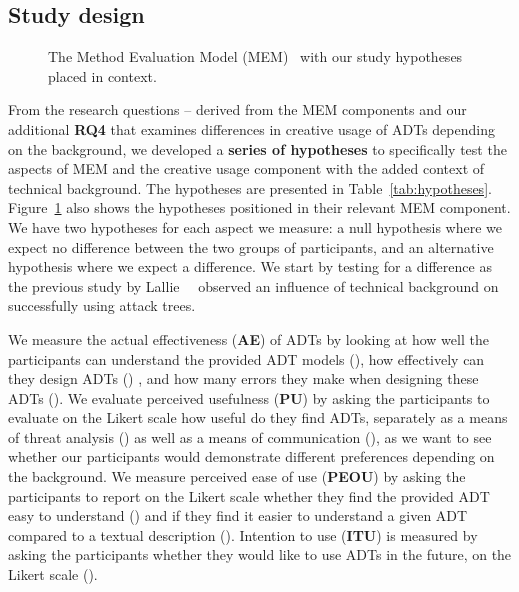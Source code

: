 \subsection{Study design}
\label{ssec:methodology-study-design}


\begin{figure}
\resizebox*{\columnwidth}{!}{}
\caption{The Method Evaluation Model (MEM)~\cite{moodyMethodEvaluationModel2003} with our study hypotheses placed in context.}
\label{fig:mem}
\end{figure}


From the research questions -- derived from the MEM components and our additional \textbf{RQ4} that examines differences in creative usage of ADTs depending on the background, we developed a \textbf{series of hypotheses} to specifically test the aspects of MEM and the creative usage component with the added context of technical background. The hypotheses are presented in Table~\ref{tab:hypotheses}. Figure~\ref{fig:mem} also shows the hypotheses positioned in their relevant MEM component. We have two hypotheses for each aspect we measure: a null hypothesis where we expect no difference between the two groups of participants, and an alternative hypothesis where we expect a difference. We start by testing for a difference as the previous study by Lallie~\etal~\cite{lallieEmpiricalEvaluationEffectiveness2017} observed an influence of technical background on successfully using attack trees.

We measure the actual effectiveness (\textbf{AE}) of ADTs by looking at how well the participants can understand the provided ADT models (\hypothesis{\hypoCheckUnderstand}), how effectively can they design ADTs (\hypothesis{\hypoSecondADT})
, and how many errors they make when designing these ADTs (\hypothesis{\hypoErrorAmount}). We evaluate perceived usefulness (\textbf{PU}) by asking the participants to evaluate on the Likert scale how useful do they find ADTs, separately as a means of threat analysis (\hypothesis{\hypoAnalysisTool}) as well as a means of communication (\hypothesis{\hypoCommunicationTool}), as we want to see whether our participants would demonstrate different preferences depending on the background. We measure perceived ease of use (\textbf{PEOU}) by asking the participants to report on the Likert scale whether they find the provided ADT easy to understand (\hypothesis{\hypoSelfUnderstand}) and if they find it easier to understand a given ADT compared to a textual description (\hypothesis{\hypoWrittenComparison}). Intention to use (\textbf{ITU}) is measured by asking the participants whether they would like to use ADTs in the future, on the Likert scale (\hypothesis{\hypoIntentionToUse}). 

